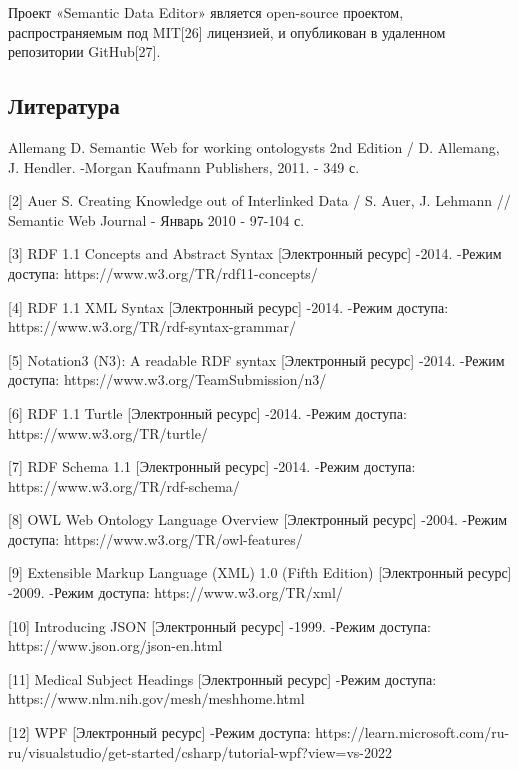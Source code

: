 \documentclass[12pt]{article}
\newcommand{\anonsection}[1]{\section*{#1}\addcontentsline{toc}{section}{#1}}
\begin{document}
Проект «Semantic Data Editor» является open-source проектом, распространяемым под MIT[26] лицензией, и опубликован в удаленном репозитории GitHub[27].

\pagebreak

\begin{center}
    {\anonsection{Литература}}
\end{center}

\begin{flushleft}
    [1] Allemang D. Semantic Web for working ontologysts 2nd Edition / D. Allemang, J. Hendler. -Morgan Kaufmann Publishers, 2011. - 349 с.

    [2] Auer S. Creating Knowledge out of Interlinked Data / S. Auer, J. Lehmann // Semantic Web Journal - Январь 2010 - 97-104 с.

    [3] RDF 1.1 Concepts and Abstract Syntax [Электронный ресурс] -2014. -Режим доступа: https://www.w3.org/TR/rdf11-concepts/

    [4] RDF 1.1 XML Syntax [Электронный ресурс] -2014. -Режим доступа: https://www.w3.org/TR/rdf-syntax-grammar/

    [5] Notation3 (N3): A readable RDF syntax [Электронный ресурс] -2014. -Режим доступа: https://www.w3.org/TeamSubmission/n3/

    [6] RDF 1.1 Turtle [Электронный ресурс] -2014. -Режим доступа: https://www.w3.org/TR/turtle/

    [7] RDF Schema 1.1 [Электронный ресурс] -2014. -Режим доступа: https://www.w3.org/TR/rdf-schema/

    [8] OWL Web Ontology Language Overview [Электронный ресурс] -2004. -Режим доступа: https://www.w3.org/TR/owl-features/

    [9] Extensible Markup Language (XML) 1.0 (Fifth Edition) [Электронный ресурс] -2009. -Режим доступа: https://www.w3.org/TR/xml/

    [10] Introducing JSON [Электронный ресурс] -1999. -Режим доступа: https://www.json.org/json-en.html

    [11] Medical Subject Headings [Электронный ресурс] -Режим доступа: https://www.nlm.nih.gov/mesh/meshhome.html

    [12] WPF [Электронный ресурс] -Режим доступа: https://learn.microsoft.com/ru-ru/visualstudio/get-started/csharp/tutorial-wpf?view=vs-2022


\end{flushleft}
\end{document}
